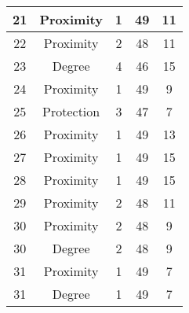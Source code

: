 \documentclass[results.tex]{subfiles}
\begin{document}
\begin{center}
\begin{tabular}{| c || c | c | c | c |}
            \hline
            21                      & Proximity                    & 1                      & 49                      & 11                   \\
            \hline
            22                      & Proximity                    & 2                      & 48                      & 11                   \\
            \hline
            23                      & Degree                       & 4                      & 46                      & 15                   \\
            \hline
            24                      & Proximity                    & 1                      & 49                      & 9                    \\
            \hline
            25                      & Protection                   & 3                      & 47                      & 7                    \\
            \hline
            26                      & Proximity                    & 1                      & 49                      & 13                   \\
            \hline
            27                      & Proximity                    & 1                      & 49                      & 15                   \\
            \hline
            28                      & Proximity                    & 1                      & 49                      & 15                   \\
            \hline
            29                      & Proximity                    & 2                      & 48                      & 11                   \\
            \hline
            30                      & Proximity                    & 2                      & 48                      & 9                    \\
            \hline
            30                      & Degree                       & 2                      & 48                      & 9                    \\
            \hline
            31                      & Proximity                    & 1                      & 49                      & 7                    \\
            \hline
            31                      & Degree                       & 1                      & 49                      & 7                    \\

\end{tabular}
\end{center}
\end{document}
